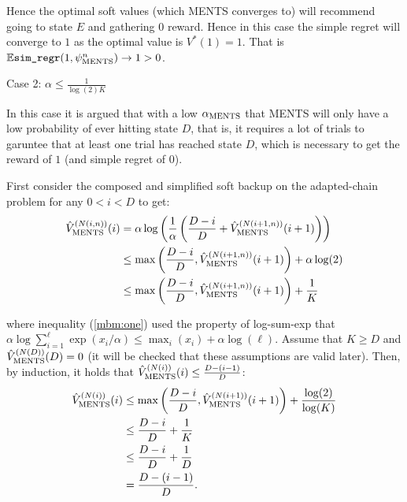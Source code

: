 \begin{proofoutline}
            Hence the optimal soft values (which MENTS converges to) will recommend going to state $E$ and gathering $0$ reward. Hence in this case the simple regret will converge to $1$ as the optimal value is $V^*(1)=1$. That is $\mathbb{E}{\textnormal{\texttt{sim\_regr}}}(1,\psi^{n}_{{\textnormal{MENTS}}}) \rightarrow 1 > 0$.
            
            Case 2: $\alpha\leq\frac{1}{\log(2)K}$ 
            
            In this case it is argued that with a low ${\alpha_{{\textnormal{MENTS}}}}$ that MENTS will only have a low probability of ever hitting state $D$, that is, it requires a lot of trials to garuntee that at least one trial has reached state $D$, which is necessary to get the reward of $1$ (and simple regret of $0$).
            
            First consider the composed and simplified soft backup on the adapted-chain problem for any $0<i<D$ to get:
            \begin{align}
                    {\hat{V}^{(N(i,n))}_{{\textnormal{MENTS}}}}(i) & = \alpha \log\left( \frac{1}{\alpha} 
                        \left( \frac{D-i}{D} + {\hat{V}^{(N(i+1,n))}_{{\textnormal{MENTS}}}}(i+1) \right)\right) \\
                    & \leq \max\left(\frac{D-i}{D},{\hat{V}^{(N(i+1,n))}_{{\textnormal{MENTS}}}}(i+1)\right) + \alpha\log(2) \label{mbm:one} \\
                    & \leq \max\left(\frac{D-i}{D},{\hat{V}^{(N(i+1,n))}_{{\textnormal{MENTS}}}}(i+1)\right) + \frac{1}{K}
            \end{align}
            
            where inequality (\ref{mbm:one}) used the property of log-sum-exp that $\alpha \log \sum_{i=1}^\ell \exp (x_i/\alpha) \leq \max_i (x_i) + \alpha \log(\ell)$. Assume that $K \geq D$ and ${\hat{V}^{(N(D))}_{{\textnormal{MENTS}}}}(D)=0$ (it will be checked that these assumptions are valid later). Then, by induction, it holds that ${\hat{V}^{(N(i))}_{{\textnormal{MENTS}}}}(i)\leq \frac{D-(i-1)}{D}$:
            \begin{align}
                {\hat{V}^{(N(i))}_{{\textnormal{MENTS}}}}(i) 
                & \leq \max\left(\frac{D-i}{D},{\hat{V}^{(N(i+1))}_{{\textnormal{MENTS}}}}(i+1)\right) + \frac{\log(2)}{\log(K)} \\
                & \leq \frac{D-i}{D} + \frac{1}{K} \\
                & \leq \frac{D-i}{D} + \frac{1}{D} \\
                & = \frac{D-(i-1)}{D}.
            \end{align}
            

\end{proofoutline}
